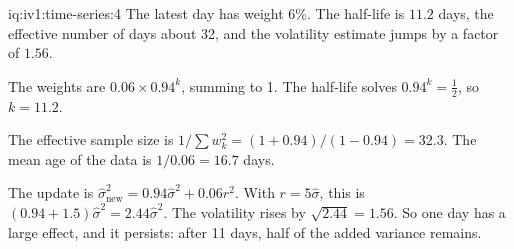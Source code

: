 \begin{solution}{iq:iv1:time-series:4}
The latest day has weight 6\%. The half-life is $11.2$ days, the effective number of days about 32, and the volatility estimate jumps by a factor of $1.56$.

The weights are $0.06 \times 0.94^k$, summing to 1. The half-life solves $0.94^k = \frac12$, so $k = 11.2$.

The effective sample size is $1/\sum w_k^2 = (1 + 0.94)/(1 - 0.94) = 32.3$. The mean age of the data is $1/0.06 = 16.7$ days.

The update is $\hat{\sigma}_{\text{new}}^2 = 0.94\hat{\sigma}^2 + 0.06r^2$. With $r = 5\hat{\sigma}$, this is $(0.94 + 1.5)\hat{\sigma}^2 = 2.44\hat{\sigma}^2$. The volatility rises by $\sqrt{2.44} = 1.56$. So one day has a large effect, and it persists: after 11 days, half of the added variance remains.



\end{solution}


